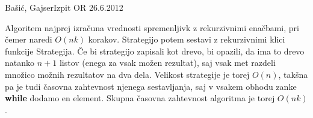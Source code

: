 \begin{naloga}{Bašić, Gajser}{Izpit OR 26.6.2012}
\begin{odgovor}
\begin{enumerate}[(a)]
Algoritem najprej izračuna vrednosti spremenljivk z rekurzivnimi enačbami,
pri čemer naredi $O(nk)$ korakov.
Strategijo potem sestavi z rekurzivnimi klici funkcije {\sc Strategija}.
Če bi strategijo zapisali kot drevo,
bi opazili, da ima to drevo natanko $n+1$ listov
(enega za vsak možen rezultat),
saj vsak met razdeli množico možnih rezultatov na dva dela.
Velikost strategije je torej $O(n)$,
tak\-šna pa je tudi časovna zahtevnost njenega sestavljanja,
saj v vsakem obhodu zanke {\bf while} dodamo en element.
Skupna časovna zahtevnost algoritma je torej $O(nk)$.
\end{enumerate}
\end{odgovor}
\end{naloga}
